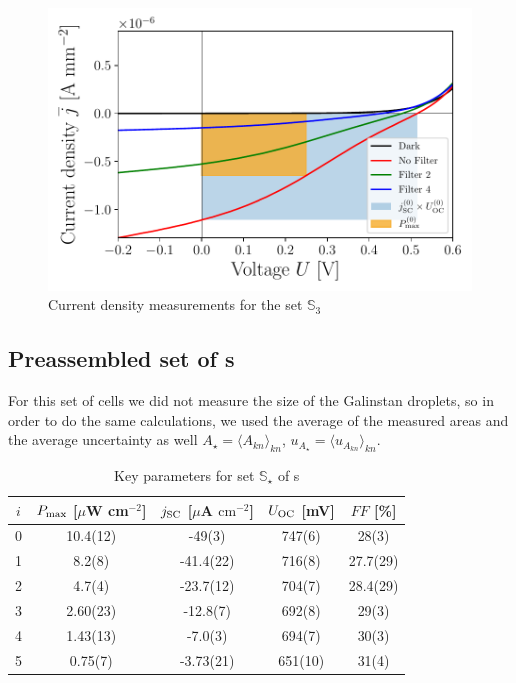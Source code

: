\begin{figure}[h]\centering
\includegraphics[width=\columnwidth]{../../../IV-Curve-Analysis/OSC2Graph.pdf}
\caption{Current density measurements for the set $\mathbb{S}_3$}
\label{fig:OSC3Graph}
\end{figure}

\subsection{Preassembled set of \BHSC s}

For this set of cells we did not measure the size of the Galinstan droplets, so in order to do the same calculations, we used the average of the measured areas and the average uncertainty as well $A_\star = \langle A_{kn} \rangle_{kn}$, $u_{A_\star} = \langle u_{A_{kn}}  \rangle_{kn}$.

\begin{table}[h]\centering
\caption{Key parameters for set $\mathbb{S}_\star$ of \BHSC s}
\label{tab:keyparamsstar}
\begin{tabular}{@{}ccccc@{}}\toprule
$i$ & $P_{\text{max}}$ [$\mu$W cm$^{-2}$] & $j_{\text{SC}}$ [$\mu$A $\mathrm{cm}^{-2}$] & $U_{\text{OC}}$ [mV] & $FF$ [\%]\\\midrule
0 &   10.4(12)  &  -49(3)  & 747(6) & 28(3) \\
1 &   8.2(8)  &  -41.4(22)  & 716(8) & 27.7(29) \\
2 &   4.7(4)  &  -23.7(12)  & 704(7) & 28.4(29) \\
3 &   2.60(23)  &  -12.8(7)  & 692(8) & 29(3) \\
4 &   1.43(13)  &  -7.0(3)  & 694(7) & 30(3)\\
5 &  0.75(7)  &  -3.73(21)  & 651(10) & 31(4) \\\bottomrule
\end{tabular}
\end{table}

